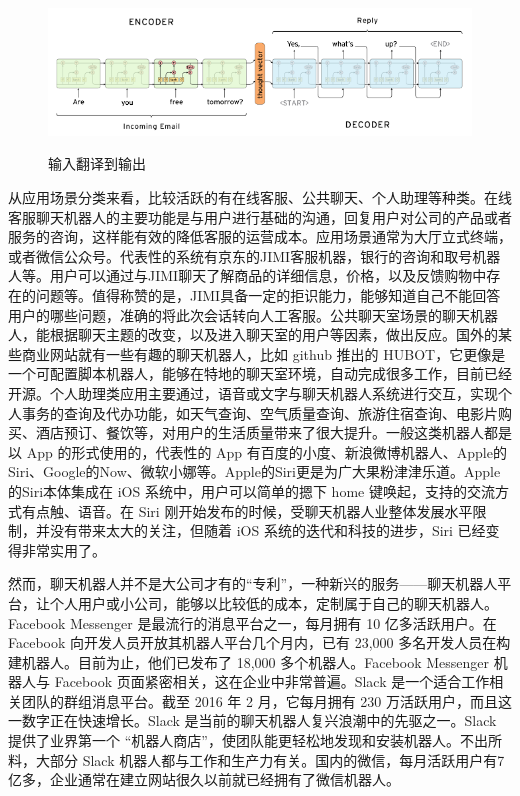 \documentclass[bachelor,winfonts]{jnuthesis}
\begin{document}
\begin{figure}[htbp]
  \centering
  \includegraphics[width= 1\textwidth]{nct-seq2seq.png}\\
  \caption{输入翻译到输出}\label{fig:pic1}
\end{figure}

从应用场景分类来看，比较活跃的有在线客服、公共聊天、个人助理等种类\cite{chinaAI}。在线客服聊天机器人的主要功能是与用户进行基础的沟通，回复用户对公司的产品或者服务的咨询，这样能有效的降低客服的运营成本。应用场景通常为大厅立式终端，或者微信公众号。代表性的系统有京东的JIMI客服机器，银行的咨询和取号机器人等。用户可以通过与JIMI聊天了解商品的详细信息，价格，以及反馈购物中存在的问题等。值得称赞的是，JIMI具备一定的拒识能力，能够知道自己不能回答用户的哪些问题，准确的将此次会话转向人工客服。公共聊天室场景的聊天机器人，能根据聊天主题的改变，以及进入聊天室的用户等因素，做出反应。国外的某些商业网站就有一些有趣的聊天机器人，比如 github 推出的 HUBOT，它更像是一个可配置脚本机器人，能够在特地的聊天室环境，自动完成很多工作，目前已经开源。个人助理类应用主要通过，语音或文字与聊天机器人系统进行交互，实现个人事务的查询及代办功能，如天气查询、空气质量查询、旅游住宿查询、电影片购买、酒店预订、餐饮等，对用户的生活质量带来了很大提升。一般这类机器人都是以 App 的形式使用的，代表性的 App  有百度的小度、新浪微博机器人、Apple的Siri、Google的Now、微软小娜等。Apple的Siri更是为广大果粉津津乐道。Apple的Siri本体集成在 iOS 系统中，用户可以简单的摁下 home 键唤起，支持的交流方式有点触、语音。在 Siri 刚开始发布的时候，受聊天机器人业整体发展水平限制，并没有带来太大的关注，但随着 iOS 系统的迭代和科技的进步，Siri 已经变得非常实用了。

然而，聊天机器人并不是大公司才有的“专利”，一种新兴的服务——聊天机器人平台，让个人用户或小公司，能够以比较低的成本，定制属于自己的聊天机器人。Facebook Messenger 是最流行的消息平台之一，每月拥有 10 亿多活跃用户。在 Facebook 向开发人员开放其机器人平台几个月内，已有 23,000 多名开发人员在构建机器人。目前为止，他们已发布了 18,000 多个机器人。Facebook Messenger 机器人与 Facebook 页面紧密相关，这在企业中非常普遍。Slack 是一个适合工作相关团队的群组消息平台。截至 2016 年 2 月，它每月拥有 230 万活跃用户，而且这一数字正在快速增长。Slack 是当前的聊天机器人复兴浪潮中的先驱之一。Slack 提供了业界第一个 “机器人商店”，使团队能更轻松地发现和安装机器人。不出所料，大部分 Slack 机器人都与工作和生产力有关。国内的微信，每月活跃用户有7亿多，企业通常在建立网站很久以前就已经拥有了微信机器人。
\end{document}
